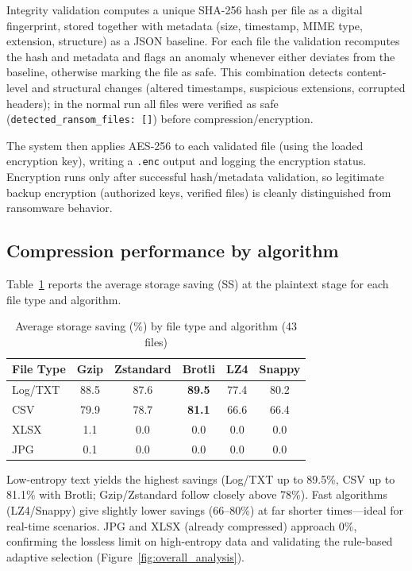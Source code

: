 \documentclass{iaesarticle}
\begin{document}
Integrity validation computes a unique SHA-256 hash per file as a digital fingerprint, stored together with metadata (size, timestamp, MIME type, extension, structure) as a JSON baseline. For each file the validation recomputes the hash and metadata and flags an anomaly whenever either deviates from the baseline, otherwise marking the file as safe. This combination detects content-level and structural changes (altered timestamps, suspicious extensions, corrupted headers); in the normal run all files were verified as safe (\texttt{detected\_ransom\_files: []}) before compression/encryption.

The system then applies AES-256 to each validated file (using the loaded encryption key), writing a \texttt{.enc} output and logging the encryption status. Encryption runs only after successful hash/metadata validation, so legitimate backup encryption (authorized keys, verified files) is cleanly distinguished from ransomware behavior.

\subsection{Compression performance by algorithm}
Table~\ref{tab:compression_results} reports the average storage saving (SS) at the plaintext stage for each file type and algorithm.

\begin{table}[htbp]
\centering
\fontsize{8pt}{10pt}\selectfont
\caption{Average storage saving (\%) by file type and algorithm (43 files)}
\label{tab:compression_results}
\begin{tabular}{l c c c c c}
\hline
\textbf{File Type} & \textbf{Gzip} & \textbf{Zstandard} & \textbf{Brotli} & \textbf{LZ4} & \textbf{Snappy} \\
\hline
Log/TXT & 88.5 & 87.6 & \textbf{89.5} & 77.4 & 80.2 \\
CSV     & 79.9 & 78.7 & \textbf{81.1} & 66.6 & 66.4 \\
XLSX    & 1.1  & 0.0  & 0.0  & 0.0  & 0.0  \\
JPG     & 0.1  & 0.0  & 0.0  & 0.0  & 0.0  \\
\hline
\end{tabular}
\end{table}

Low-entropy text yields the highest savings (Log/TXT up to 89.5\%, CSV up to 81.1\% with Brotli; Gzip/Zstandard follow closely above 78\%). Fast algorithms (LZ4/Snappy) give slightly lower savings (66--80\%) at far shorter times---ideal for real-time scenarios. JPG and XLSX (already compressed) approach 0\%, confirming the lossless limit on high-entropy data and validating the rule-based adaptive selection (Figure~\ref{fig:overall_analysis}).
\end{document}
